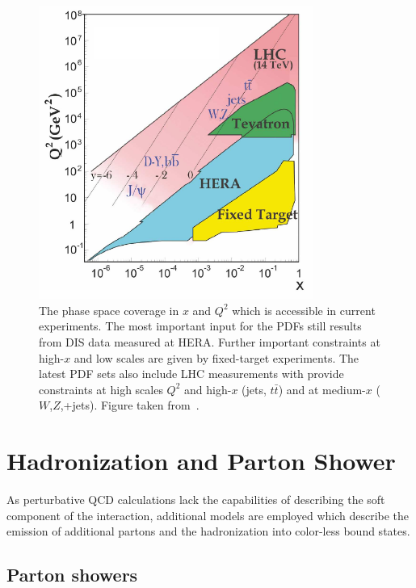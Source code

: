 \begin{figure}[htb] 
    \centering
    \includegraphics[width=0.8\textwidth]{figures/sm_model/phasespace.pdf}\hfill
    \caption[Kinematic phase space region of the experiments]{The phase space
        coverage in $x$ and $Q^2$ which is accessible in current experiments.
        The most important input for the PDFs still results from DIS data
        measured at HERA. Further important constraints at high-$x$ and low
        scales are given by fixed-target experiments. The latest PDF sets also
        include LHC measurements with provide constraints at high scales $Q^2$
        and high-$x$ (jets, $t\bar t$) and at medium-$x$ ($W$,$Z$,+jets). Figure
        taken from~\cite{Agashe:2014kda}.} 
    \label{fig:kinematic_phasepace} 
\end{figure}

\section{Hadronization and Parton Shower}

As perturbative QCD calculations lack the capabilities of describing the
soft component of the interaction, additional models are employed which describe
the emission of additional partons and the hadronization into color-less bound
states. 

\subsection{Parton showers}

